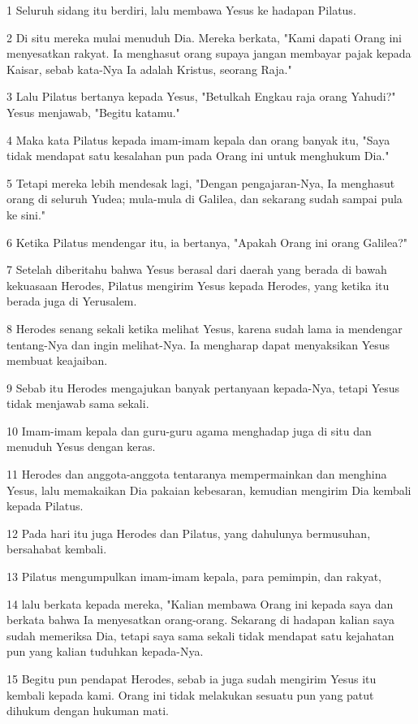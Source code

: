 \par 1 Seluruh sidang itu berdiri, lalu membawa Yesus ke hadapan Pilatus.
\par 2 Di situ mereka mulai menuduh Dia. Mereka berkata, "Kami dapati Orang ini menyesatkan rakyat. Ia menghasut orang supaya jangan membayar pajak kepada Kaisar, sebab kata-Nya Ia adalah Kristus, seorang Raja."
\par 3 Lalu Pilatus bertanya kepada Yesus, "Betulkah Engkau raja orang Yahudi?" Yesus menjawab, "Begitu katamu."
\par 4 Maka kata Pilatus kepada imam-imam kepala dan orang banyak itu, "Saya tidak mendapat satu kesalahan pun pada Orang ini untuk menghukum Dia."
\par 5 Tetapi mereka lebih mendesak lagi, "Dengan pengajaran-Nya, Ia menghasut orang di seluruh Yudea; mula-mula di Galilea, dan sekarang sudah sampai pula ke sini."
\par 6 Ketika Pilatus mendengar itu, ia bertanya, "Apakah Orang ini orang Galilea?"
\par 7 Setelah diberitahu bahwa Yesus berasal dari daerah yang berada di bawah kekuasaan Herodes, Pilatus mengirim Yesus kepada Herodes, yang ketika itu berada juga di Yerusalem.
\par 8 Herodes senang sekali ketika melihat Yesus, karena sudah lama ia mendengar tentang-Nya dan ingin melihat-Nya. Ia mengharap dapat menyaksikan Yesus membuat keajaiban.
\par 9 Sebab itu Herodes mengajukan banyak pertanyaan kepada-Nya, tetapi Yesus tidak menjawab sama sekali.
\par 10 Imam-imam kepala dan guru-guru agama menghadap juga di situ dan menuduh Yesus dengan keras.
\par 11 Herodes dan anggota-anggota tentaranya mempermainkan dan menghina Yesus, lalu memakaikan Dia pakaian kebesaran, kemudian mengirim Dia kembali kepada Pilatus.
\par 12 Pada hari itu juga Herodes dan Pilatus, yang dahulunya bermusuhan, bersahabat kembali.
\par 13 Pilatus mengumpulkan imam-imam kepala, para pemimpin, dan rakyat,
\par 14 lalu berkata kepada mereka, "Kalian membawa Orang ini kepada saya dan berkata bahwa Ia menyesatkan orang-orang. Sekarang di hadapan kalian saya sudah memeriksa Dia, tetapi saya sama sekali tidak mendapat satu kejahatan pun yang kalian tuduhkan kepada-Nya.
\par 15 Begitu pun pendapat Herodes, sebab ia juga sudah mengirim Yesus itu kembali kepada kami. Orang ini tidak melakukan sesuatu pun yang patut dihukum dengan hukuman mati.
